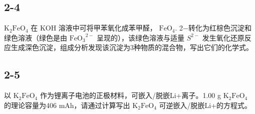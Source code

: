 \subsection*{2-4}
$\mathrm { K _ { 2 } F e O _ { 4 } }$ 在 $\mathrm { K O H }$ 溶液中可将甲苯氧化成苯甲醛， $\mathrm { F e O } _ { 4 } \mathrm { . }$ 2−转化为红棕⾊沉淀和绿⾊溶液（绿⾊是由 $\mathrm { F e O _ { 3 } } ^ { 2 - }$ 呈现的），该绿⾊溶液与适量 $S ^ { 2 - }$ 发⽣氧化还原反应⽣成深⾊沉淀，组成分析发现该沉淀为3种物质的混合物，写出它们的化学式。

\subsection*{2-5}
以 $\mathrm { K _ { 2 } F e O _ { 4 } }$ 作为锂离⼦电池的正极材料，可嵌⼊/脱嵌Li+离⼦。1.00 g $\mathrm { K _ { 2 } F e O _ { 4 } }$ 的理论容量为406 mAh，请通过计算写出 $\mathrm { K _ { 2 } F e O _ { 4 } }$ 可逆嵌⼊/脱嵌Li+的⽅程式。
